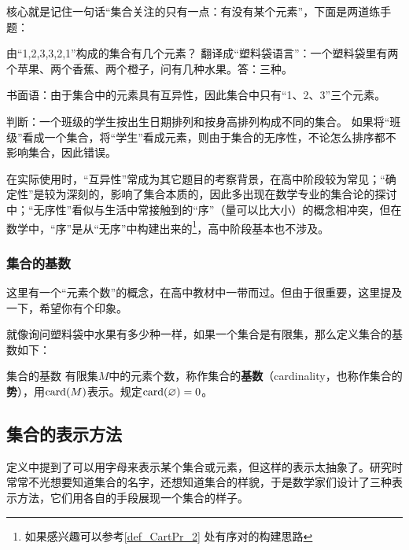 核心就是记住一句话“集合关注的只有一点：有没有某个元素”，下面是两道练手题：

\begin{example}{由“1,2,3,3,2,1”构成的集合有几个元素？}
翻译成“塑料袋语言”：一个塑料袋里有两个苹果、两个香蕉、两个橙子，问有几种水果。答：三种。

书面语：由于集合中的元素具有互异性，因此集合中只有“1、2、3”三个元素。
\end{example}

\begin{example}{判断：一个班级的学生按出生日期排列和按身高排列构成不同的集合。}
如果将“班级”看成一个集合，将“学生”看成元素，则由于集合的无序性，不论怎么排序都不影响集合，因此错误。
\end{example}

在实际使用时，“互异性”常成为其它题目的考察背景，在高中阶段较为常见；“确定性”是较为深刻的，影响了集合本质的，因此多出现在数学专业的集合论的探讨中；“无序性”看似与生活中常接触到的“序”（量可以比大小）的概念相冲突，但在数学中，“序”是从“无序”中构建出来的\footnote{如果感兴趣可以参考\autoref{def_CartPr_2} 处有序对的构建思路}，高中阶段基本也不涉及。

\subsubsection{集合的基数}

这里有一个“元素个数”的概念，在高中教材中一带而过。但由于很重要，这里提及一下，希望你有个印象。

就像询问塑料袋中水果有多少种一样，如果一个集合是有限集，那么定义集合的基数如下：

\begin{definition}{集合的基数}
有限集$M$中的元素个数，称作集合的\textbf{基数}（cardinality，也称作集合的\textbf{势}），用${\rm card}(M)$表示。规定${\rm card}(\varnothing)=0$。
\end{definition}






\subsection{集合的表示方法}

定义中提到了可以用字母来表示某个集合或元素，但这样的表示太抽象了。研究时常常不光想要知道集合的名字，还想知道集合的样貌，于是数学家们设计了三种表示方法，它们用各自的手段展现一个集合的样子。

